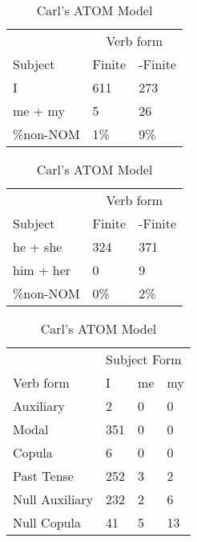 \begin{table}[]
    \caption{Carl's ATOM Model}
    \begin{minipage}{0.5\textwidth}
    \centering
    \begin{tabular}{@{}lll@{}}
        \toprule
         &\multicolumn{2}{c}{Verb form}\\
         \cline{2-3}
        Subject & Finite & -Finite \\
        \midrule
        I & 611 & 273 \\
        me + my & 5 & 26 \\
        \hline
        \%non-NOM & 1\% & 9\% \\
        \bottomrule
    \end{tabular}
\end{minipage}
\begin{minipage}{0.5\textwidth}
    \centering
    \begin{tabular}{@{}lll@{}}
        \toprule
         &\multicolumn{2}{c}{Verb form}\\
         \cline{2-3}
        Subject & Finite & -Finite \\
        \midrule
        he + she & 324 & 371 \\
        him + her & 0 & 9 \\
        \hline
        \%non-NOM & 0\% & 2\% \\
        \bottomrule
    \end{tabular}
    \end{minipage}
    \begin{minipage}{0.5\textwidth}
    \centering
    \begin{tabular}{@{}llll@{}}
        \toprule
            &\multicolumn{3}{l}{Subject Form}\\
            \cline{2-4}
        Verb form & I & me & my \\
        \midrule
        Auxiliary & 2 & 0 & 0 \\
        Modal & 351 & 0 & 0 \\
        Copula & 6 & 0 & 0 \\
        Past Tense & 252 & 3 & 2 \\
        \hline
        Null Auxiliary & 232 & 2 & 6 \\
        Null Copula & 41 & 5 & 13 \\
        \bottomrule
    \end{tabular}

\end{minipage}
\end{table}
